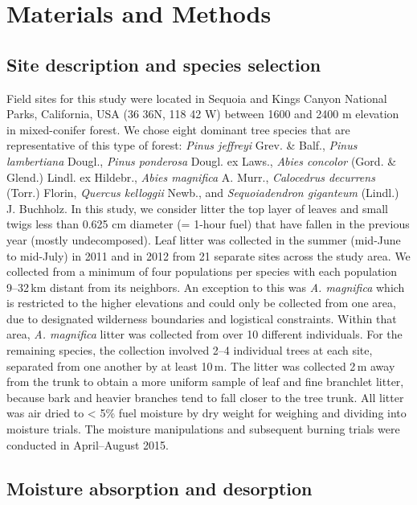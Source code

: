 \documentclass[letterpaper,12pt]{article}
\begin{document}
\section*{Materials and Methods}

\subsection*{Site description and species selection}

Field sites for this study were located in Sequoia and Kings Canyon National
Parks, California, USA (36 36N, 118 42 W) between 1600 and 2400 m elevation in
mixed-conifer forest. We chose eight dominant tree species that are
representative of this type of forest: \emph{Pinus jeffreyi} Grev. \& Balf.,
\emph{Pinus lambertiana} Dougl., \emph{Pinus ponderosa} Dougl. ex Laws.,
\emph{Abies concolor} (Gord. \& Glend.) Lindl. ex Hildebr., \emph{Abies
  magnifica} A. Murr., \emph{Calocedrus decurrens} (Torr.) Florin,
\emph{Quercus kelloggii} Newb., and \emph{Sequoiadendron giganteum} (Lindl.) J.
Buchholz. In this study, we consider litter the top layer of leaves and small
twigs less than 0.625 cm diameter (= 1-hour fuel) that have fallen in the
previous year (mostly undecomposed). Leaf litter was collected in the summer
(mid-June to mid-July) in 2011 and in 2012 from 21 separate sites across the
study area. We collected from a minimum of four populations per species with
each population 9--32\,km distant from its neighbors. An exception to this was
\emph{A. magnifica} which is restricted to the higher elevations and could only
be collected from one area, due to designated wilderness boundaries and
logistical constraints. Within that area, \emph{A. magnifica} litter was
collected from over 10 different individuals. For the remaining species, the
collection involved 2--4 individual trees at each site, separated from one
another by at least 10\,m. The litter was collected 2\,m away from the trunk to
obtain a more uniform sample of leaf and fine branchlet litter, because bark
and heavier branches tend to fall closer to the tree trunk. All litter was air
dried to < 5\% fuel moisture by dry weight for weighing and dividing into
moisture trials. The moisture manipulations and subsequent burning trials were
conducted in April--August 2015.

\subsection*{Moisture absorption and desorption}
\end{document}
